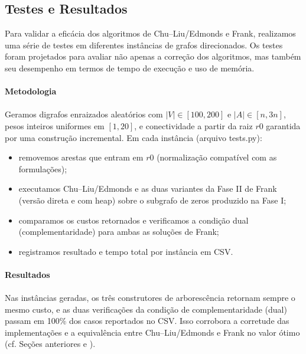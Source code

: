\documentclass[12pt,a4paper]{article}
\def\texttt#1{#1}%
\def\emph#1{#1}%
\begin{document}
\subsection{Testes e Resultados}

Para validar a eficácia dos algoritmos de \emph{Chu–Liu/Edmonds} e \emph{Frank}, realizamos uma série de testes em diferentes instâncias de grafos direcionados. Os testes foram projetados para avaliar não apenas a correção dos algoritmos, mas também seu desempenho em termos de tempo de execução e uso de memória.

\paragraph{Metodologia}
\paragraph{}
Geramos digrafos enraizados aleatórios com \(|V|\in[100,200]\) e \(|A|\in[n,3n]\), pesos inteiros uniformes em \([1,20]\), e conectividade a partir da raiz \(r0\) garantida por uma construção incremental. Em cada instância (arquivo \texttt{tests.py}):
\begin{itemize}\setlength{\itemsep}{1pt}
    \item removemos arestas que entram em \(r0\) (normalização compatível com as formulações);
    \item executamos \emph{Chu–Liu/Edmonds} e as duas variantes da Fase II de \emph{Frank} (versão direta e com heap) sobre o subgrafo de zeros produzido na Fase I;
    \item comparamos os custos retornados e verificamos a \emph{condição dual} (complementaridade) para ambas as soluções de Frank;
    \item registramos resultado e tempo total por instância em CSV.
\end{itemize}

\paragraph{Resultados}
\paragraph{}
Nas instâncias geradas, os três construtores de arborescência retornam sempre o mesmo custo, e as duas verificações da condição de complementaridade (dual) passam em 100\% dos casos reportados no CSV. Isso corrobora a corretude das implementações e a equivalência entre \emph{Chu--Liu/Edmonds} e \emph{Frank} no valor ótimo (cf. Seções anteriores e \cite{frank2014,schrijver2003comb}).
\end{document}
